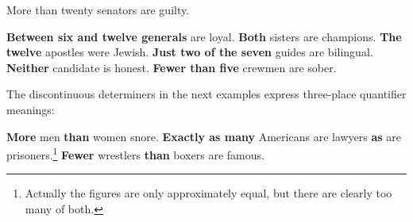 {\ea
More than twenty  senators are guilty.   
\z
{}

\ea
\textbf{Between six and twelve generals} are loyal.
\z
\ea 
\textbf{Both} sisters are champions.
\z
\ea
\textbf{The twelve} apostles were Jewish.
\z
\ea
\textbf{Just two of the seven} guides are bilingual.
\z
\ea 
\textbf{Neither} candidate is honest.
\z
\ea 
\textbf{Fewer than five} crewmen are sober.
\z

The discontinuous determiners in the next examples express three-place quantifier meanings:

\ea
\textbf{More} men \textbf{than} women snore.
\z
\ea 
\textbf{Exactly as many} Americans are lawyers \textbf{as} are prisoners.\footnote{Actually the figures are only approximately equal, but there are clearly too many of both.} 
\z
\ea
\textbf{Fewer} wrestlers \textbf{than} boxers are famous. 
\z
}
